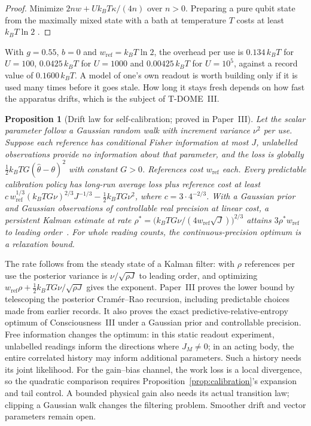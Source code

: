 \documentclass[12pt]{article}
\newtheorem{proposition}[theorem]{Proposition}
\begin{document}
\begin{proof}
Minimize $2nw+Uk_BT\kappa/(4n)$ over $n>0$. Preparing a pure qubit state from the maximally mixed state with a bath at temperature $T$ costs at least $k_BT\ln2$ \cite{Landauer1961,ReebWolf2014}.
\end{proof}

With $g=0.55$, $b=0$ and $w_{\mathrm{ref}}=k_BT\ln2$, the overhead per use is $0.134\,k_BT$ for $U=100$, $0.0425\,k_BT$ for $U=1000$ and $0.00425\,k_BT$ for $U=10^5$, against a record value of $0.1600\,k_BT$. A model of one's own readout is worth building only if it is used many times before it goes stale. How long it stays fresh depends on how fast the apparatus drifts, which is the subject of T-DOME~III.

\begin{proposition}[Drift law for self-calibration; proved in Paper~III]
\label{conj:drift}
Let the scalar parameter follow a Gaussian random walk with increment variance $\nu^2$ per use. Suppose each reference has conditional Fisher information at most $J$, unlabelled observations provide no information about that parameter, and the loss is globally $\tfrac12k_BTG(\hat\theta-\theta)^2$ with constant $G>0$. References cost $w_{\mathrm{ref}}$ each. Every predictable calibration policy has long-run average loss plus reference cost at least $c\,w_{\mathrm{ref}}^{1/3}(k_BTG\nu)^{2/3}J^{-1/3}-\tfrac12k_BTG\nu^2$, where $c=3\cdot4^{-2/3}$. With a Gaussian prior and Gaussian observations of controllable real precision at linear cost, a persistent Kalman estimate at rate $\rho^*=\bigl(k_BTG\nu/(4w_{\mathrm{ref}}\sqrt J)\bigr)^{2/3}$ attains $3\rho^*w_{\mathrm{ref}}$ to leading order~\cite{Liu2026TDOME_III}. For whole reading counts, the continuous-precision optimum is a relaxation bound.
\end{proposition}

The rate follows from the steady state of a Kalman filter: with $\rho$ references per use the posterior variance is $\nu/\sqrt{\rho J}$ to leading order, and optimizing $w_{\mathrm{ref}}\rho+\tfrac12k_BTG\nu/\sqrt{\rho J}$ gives the exponent. Paper~III proves the lower bound by telescoping the posterior Cram\'er--Rao recursion, including predictable choices made from earlier records. It also proves the exact predictive-relative-entropy optimum of Consciousness~III under a Gaussian prior and controllable precision. Free information changes the optimum: in this static readout experiment, unlabelled readings inform the directions where $J_M\neq0$; in an acting body, the entire correlated history may inform additional parameters. Such a history needs its joint likelihood. For the gain--bias channel, the work loss is a local divergence, so the quadratic comparison requires Proposition~\ref{prop:calibration}'s expansion and tail control. A bounded physical gain also needs its actual transition law; clipping a Gaussian walk changes the filtering problem. Smoother drift and vector parameters remain open.
\end{document}
